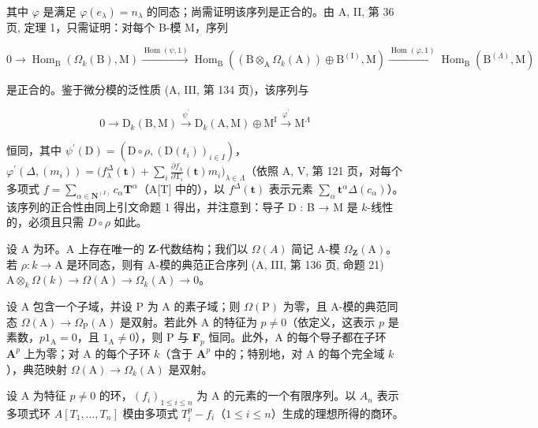 其中 \(\varphi\) 是满足 \(\varphi(e_{\lambda}) = n_{\lambda}\) 的同态；尚需证明该序列是正合的。由 A, II, 第 36 页, 定理 1，只需证明：对每个 B-模 M，序列

\[
0 \to \operatorname{Hom} _ {\mathrm{B}} (\Omega _{k}(\mathrm{B}), \mathrm{M}) \xrightarrow {\operatorname{Hom}(\psi,1)} \operatorname{Hom} _{\mathrm{B}} ((\mathrm{B} \otimes_{\mathrm{A}} \Omega _{k}(\mathrm{A})) \oplus \mathrm{B}^{(\mathrm{I})}, \mathrm{M}) \xrightarrow {\operatorname{Hom}(\varphi,1)} \operatorname{Hom}_{\mathrm{B}}(\mathrm{B}^{(\Lambda)}, \mathrm{M})
\]

是正合的。鉴于微分模的泛性质 (A, III, 第 134 页)，该序列与

\[
0 \to \mathrm{D} _ {k} (\mathrm{B}, \mathrm{M}) \xrightarrow {\psi^ {\prime}} \mathrm{D} _ {k} (\mathrm{A}, \mathrm{M}) \oplus \mathrm{M} ^ {\mathrm{I}} \xrightarrow {\varphi^ {\prime}} \mathrm{M} ^ {\Lambda}
\]

恒同，其中 \(\psi^{\prime}(\mathrm{D}) = (\mathrm{D}\circ \rho,(\mathrm{D}(t_{i}))_{i\in I})\)，\(\varphi^{\prime}(\Delta,(m_{i})) = \big(f_{\lambda}^{\Delta}(\mathbf{t}) + \sum_{i}\frac{\partial f_{\lambda}}{\partial\mathrm{T}_{i}}(\mathbf{t})m_{i}\big)_{\lambda \in \Lambda}\)（依照 A, V, 第 121 页，对每个多项式 \(f = \sum_{\alpha \in \mathbf{N}^{(I)}}c_{\alpha}\mathbf{T}^{\alpha}\)（A{[}T{]} 中的），以 \(f^{\Delta}(\mathbf{t})\) 表示元素 \(\sum_{\alpha}\mathbf{t}^{\alpha}\Delta(c_{\alpha})\)）。该序列的正合性由同上引文命题 1 得出，并注意到：导子 D : B → M 是 \(k\)-线性的，必须且只需 \(D\circ\rho\) 如此。

设 A 为环。A 上存在唯一的 \(\mathbf{Z}\)-代数结构；我们以 \(\Omega(A)\) 简记 A-模 \(\Omega_{\mathbf{Z}}(\mathrm{A})\)。若 \(\rho : k \to \mathrm{A}\) 是环同态，则有 A-模的典范正合序列 (A, III, 第 136 页, 命题 21) \(\mathrm{A} \otimes_k \Omega(k) \to \Omega(\mathrm{A}) \to \Omega_k(\mathrm{A}) \to 0\)。

设 A 包含一个子域，并设 P 为 A 的素子域；则 \(\Omega(\mathrm{P})\) 为零，且 A-模的典范同态 \(\Omega(\mathrm{A}) \to \Omega_{\mathrm{P}}(\mathrm{A})\) 是双射。若此外 A 的特征为 \(p \neq 0\)（依定义，这表示 \(p\) 是素数，\(p1_{\mathrm{A}} = 0\)，且 \(1_{\mathrm{A}} \neq 0\)），则 P 与 \(\mathbf{F}_p\) 恒同。此外，A 的每个导子都在子环 \(\mathbf{A}^p\) 上为零；对 A 的每个子环 \(k\)（含于 \(\mathbf{A}^p\) 中的；特别地，对 A 的每个完全域 \(k\)），典范映射 \(\Omega(\mathrm{A}) \to \Omega_k(\mathrm{A})\) 是双射。

设 A 为特征 \(p \neq 0\) 的环，\((f_i)_{1 \leqslant i \leqslant n}\) 为 A 的元素的一个有限序列。以 \(A_n\) 表示多项式环 \(A[T_1, \ldots, T_n]\) 模由多项式 \(T_i^p - f_i\)（\(1 \leqslant i \leqslant n\)）生成的理想所得的商环。

